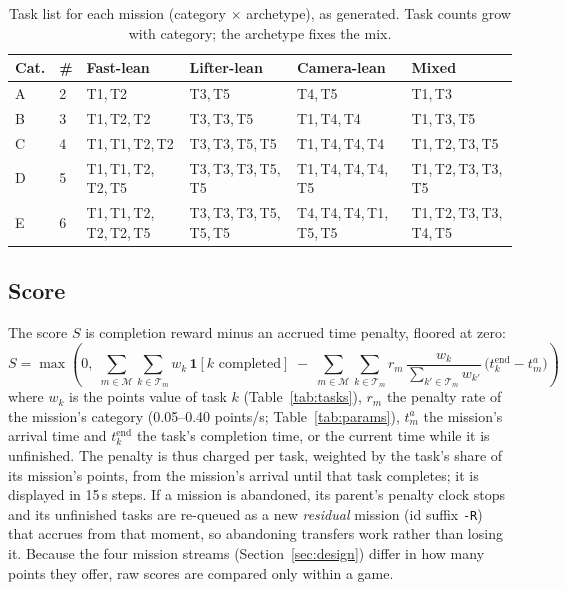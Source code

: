 \documentclass[10pt]{article}
\theoremstyle{definition}
\begin{document}
\begin{table}[htbp]
\centering
\caption{Task list for each mission (category $\times$ archetype), as generated. Task counts grow with category; the
archetype fixes the mix.}
\label{tab:categories}
\small
\renewcommand{\arraystretch}{1.15}
\begin{tabular}{llllll}
\toprule
\textbf{Cat.} & \textbf{\#} & \textbf{Fast-lean} & \textbf{Lifter-lean} & \textbf{Camera-lean} & \textbf{Mixed} \\
\midrule
A & 2 & T1,\,T2                & T3,\,T5                & T4,\,T5                & T1,\,T3                \\
B & 3 & T1,\,T2,\,T2           & T3,\,T3,\,T5           & T1,\,T4,\,T4           & T1,\,T3,\,T5           \\
C & 4 & T1,\,T1,\,T2,\,T2      & T3,\,T3,\,T5,\,T5      & T1,\,T4,\,T4,\,T4      & T1,\,T2,\,T3,\,T5      \\
D & 5 & T1,\,T1,\,T2,\,T2,\,T5 & T3,\,T3,\,T3,\,T5,\,T5 & T1,\,T4,\,T4,\,T4,\,T5 & T1,\,T2,\,T3,\,T3,\,T5 \\
E & 6 & T1,\,T1,\,T2,\,T2,\,T2,\,T5 & T3,\,T3,\,T3,\,T5,\,T5,\,T5 & T4,\,T4,\,T4,\,T1,\,T5,\,T5 & T1,\,T2,\,T3,\,T3,\,T4,\,T5 \\
\bottomrule
\end{tabular}
\end{table}

\subsection{Score}\label{sec:metric}

The score $S$ is completion reward minus an accrued time penalty, floored at zero:
\begin{equation}
S = \max\!\left(0,\;
    \sum_{m \in \mathcal{M}} \sum_{k \in \mathcal{T}_m} w_k \, \mathbf{1}[k\text{ completed}]
    \;-\;
    \sum_{m \in \mathcal{M}} \sum_{k \in \mathcal{T}_m}
      r_m \, \frac{w_k}{\sum_{k' \in \mathcal{T}_m} w_{k'}}
      \, \bigl(t^{\mathrm{end}}_k - t^a_m\bigr)
  \right)
\label{eq:score}
\end{equation}
where $w_k$ is the points value of task $k$ (Table~\ref{tab:tasks}), $r_m$ the penalty rate of the mission's category
(0.05--0.40 points/s; Table~\ref{tab:params}), $t^a_m$ the mission's arrival time and $t^{\mathrm{end}}_k$ the task's
completion time, or the current time while it is unfinished. The penalty is thus charged per task, weighted by the
task's share of its mission's points, from the mission's arrival until that task completes; it is displayed in 15\,s
steps. If a mission is abandoned, its parent's penalty clock stops and its unfinished tasks are re-queued as a new
\emph{residual} mission (id suffix \texttt{-R}) that accrues from that moment, so abandoning transfers work rather
than losing it. Because the four mission streams (Section~\ref{sec:design}) differ in how many points they offer, raw
scores are compared only within a game.
\end{document}
